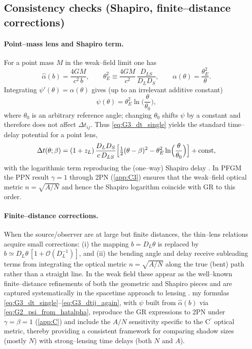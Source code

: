 \documentclass{iopjournal}
\begin{document}
\subsection{Consistency checks (Shapiro, finite–distance corrections)}\label{app:G4}

\paragraph{Point–mass lens and Shapiro term.}
For a point mass $M$ in the weak–field limit one has
\[
\hat\alpha(b)=\frac{4GM}{c^2\,b},\qquad
\theta_E^2\equiv \frac{4GM}{c^2}\,\frac{D_{LS}}{D_LD_S},
\qquad
\alpha(\theta)=\frac{\theta_E^2}{\theta}.
\]
Integrating $\psi'(\theta)=\alpha(\theta)$ gives (up to an irrelevant additive constant)
\begin{equation}
\psi(\theta)=\theta_E^2\ln\!\Big(\frac{\theta}{\theta_0}\Big),
\label{eq:G4_psi_PM}
\end{equation}
where $\theta_0$ is an arbitrary reference angle; changing $\theta_0$ shifts $\psi$ by a constant and therefore does not affect $\Delta t_{ij}$. Thus \eqref{eq:G3_dt_single} yields the standard time–delay potential for a point lens,
\begin{equation}
\Delta t(\theta;\beta)=(1+z_L)\,\frac{D_LD_S}{c\,D_{LS}}
\Big[\tfrac12(\theta-\beta)^2-\theta_E^2\ln\!\Big(\frac{\theta}{\theta_0}\Big)\Big]+{\rm const},
\label{eq:G4_dt_PM}
\end{equation}
with the logarithmic term reproducing the (one–way) Shapiro delay \cite{SchneiderEhlersFalco1992,Perlick2004LRR,Shapiro1964}. In PFGM the PPN result $\gamma=1$ through 2PN (\cref{app:C3}) ensures that the weak–field optical metric $n=\sqrt{A/N}$ and hence the Shapiro logarithm coincide with GR to this order.

\paragraph{Finite–distance corrections.}
When the source/observer are at large but finite distances, the thin–lens relations acquire small corrections: (i) the mapping $b=D_L\theta$ is replaced by $b\simeq D_L\theta\,[1+\mathcal O(D_L^{-1})]$, and (ii) the bending angle and delay receive subleading terms from integrating the optical metric $n=\sqrt{A/N}$ along the true (bent) path rather than a straight line. In the weak field these appear as the well–known finite–distance refinements of both the geometric and Shapiro pieces and are captured systematically in the spacetime approach to lensing \cite[\S2–\S3]{Perlick2004LRR}. my formulas \eqref{eq:G3_dt_single}–\eqref{eq:G3_dtij_again}, with $\psi$ built from $\hat\alpha(b)$ via \eqref{eq:G2_psi_from_hatalpha}, reproduce the GR expressions to 2PN under $\gamma=\beta=1$ (\cref{app:C}) and include the $A/N$ sensitivity specific to the C$^\prime$ optical metric, thereby providing a consistent framework for comparing shadow sizes (mostly $N$) with strong–lensing time delays (both $N$ and $A$).
\end{document}

